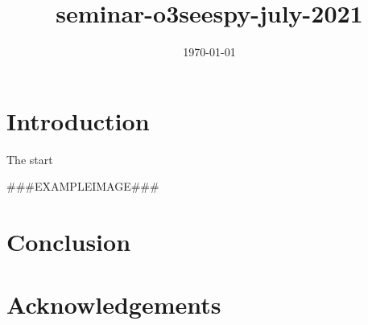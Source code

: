\documentclass[times]{article}
\begin{document}
\title{seminar-o3seespy-july-2021}

\onecolumn

\author{}
\date{\today}

\maketitle


\tableofcontents

\newpage

\section{Introduction}

The start

###EXAMPLEIMAGE###

\section{Conclusion}

\section{Acknowledgements}



\end{document}
